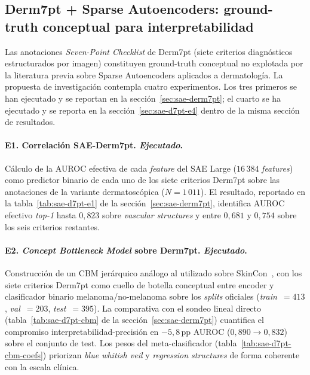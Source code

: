 \subsection{Derm7pt + Sparse Autoencoders: ground-truth conceptual
para interpretabilidad}
\label{sec:linea-derm7pt-sae}

Las anotaciones \emph{Seven-Point Checklist} de Derm7pt
(siete criterios diagnósticos estructurados por imagen) constituyen
ground-truth conceptual no explotada por la literatura previa sobre
Sparse Autoencoders aplicados a dermatología. La propuesta de
investigación contempla cuatro experimentos. Los tres primeros se
han ejecutado y se reportan en la
secci\'on~\ref{sec:sae-derm7pt}; el cuarto se ha ejecutado y se
reporta en la secci\'on~\ref{sec:sae-d7pt-e4} dentro de la misma
sección de resultados.

\paragraph{E1. Correlación SAE-Derm7pt. \emph{Ejecutado}.}
Cálculo de la AUROC efectiva de cada \emph{feature} del SAE Large
($16\,384$ \emph{features}) como predictor binario de cada uno
de los siete criterios Derm7pt sobre las anotaciones de la variante
dermatoscópica ($N = 1\,011$). El resultado, reportado en
la tabla~\ref{tab:sae-d7pt-e1} de la
secci\'on~\ref{sec:sae-derm7pt}, identifica AUROC efectivo
\emph{top-1} hasta $0{,}823$ sobre \emph{vascular structures}
y entre $0{,}681$ y $0{,}754$ sobre los seis criterios
restantes.

\paragraph{E2. \emph{Concept Bottleneck Model} sobre Derm7pt.
\emph{Ejecutado}.}
Construcción de un CBM jerárquico análogo al utilizado sobre
SkinCon~\cite{skincon}, con los siete criterios Derm7pt como
cuello de botella conceptual entre encoder y clasificador binario
melanoma/no-melanoma sobre los \emph{splits} oficiales
(\emph{train}~$=413$, \emph{val}~$=203$, \emph{test}~$=395$). La
comparativa con el sondeo lineal directo
(tabla~\ref{tab:sae-d7pt-cbm} de la
secci\'on~\ref{sec:sae-derm7pt}) cuantifica el compromiso
interpretabilidad-precisión en $-5{,}8$\,pp AUROC
($0{,}890 \to 0{,}832$) sobre el conjunto de test. Los pesos del
meta-clasificador (tabla~\ref{tab:sae-d7pt-cbm-coefs})
priorizan \emph{blue whitish veil} y \emph{regression structures}
de forma coherente con la escala clínica.

